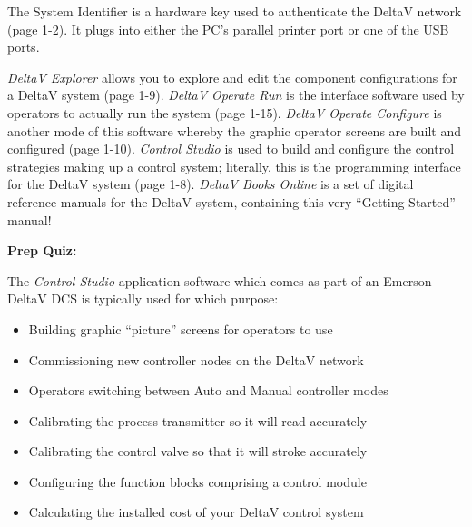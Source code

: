 \vskip 10pt

The System Identifier is a hardware key used to authenticate the DeltaV network (page 1-2).  It plugs into either the PC's parallel printer port or one of the USB ports.

\vskip 10pt

{\it DeltaV Explorer} allows you to explore and edit the component configurations for a DeltaV system (page 1-9).  {\it DeltaV Operate Run} is the interface software used by operators to actually run the system (page 1-15).  {\it DeltaV Operate Configure} is another mode of this software whereby the graphic operator screens are built and configured (page 1-10).  {\it Control Studio} is used to build and configure the control strategies making up a control system; literally, this is the programming interface for the DeltaV system (page 1-8).  {\it DeltaV Books Online} is a set of digital reference manuals for the DeltaV system, containing this very ``Getting Started'' manual!







\vfil \eject

\noindent
{\bf Prep Quiz:}

The {\it Control Studio} application software which comes as part of an Emerson DeltaV DCS is typically used for which purpose:

\begin{itemize}
\item{} Building graphic ``picture'' screens for operators to use
\vskip 5pt 
\item{} Commissioning new controller nodes on the DeltaV network
\vskip 5pt 
\item{} Operators switching between Auto and Manual controller modes
\vskip 5pt 
\item{} Calibrating the process transmitter so it will read accurately
\vskip 5pt 
\item{} Calibrating the control valve so that it will stroke accurately
\vskip 5pt 
\item{} Configuring the function blocks comprising a control module
\vskip 5pt 
\item{} Calculating the installed cost of your DeltaV control system
\end{itemize}






